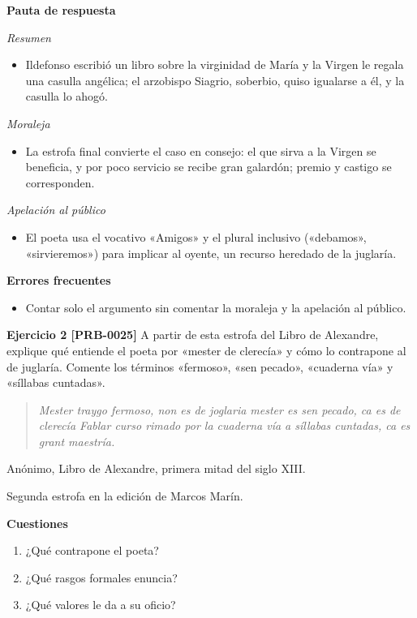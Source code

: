 \documentclass{book}
\begin{document}
\noindent\textbf{Pauta de respuesta}

\noindent\textit{Resumen}
\begin{itemize}
\item Ildefonso escribió un libro sobre la virginidad de María y la Virgen le regala una casulla angélica; el arzobispo Siagrio, soberbio, quiso igualarse a él, y la casulla lo ahogó.
\end{itemize}

\noindent\textit{Moraleja}
\begin{itemize}
\item La estrofa final convierte el caso en consejo: el que sirva a la Virgen se beneficia, y por poco servicio se recibe gran galardón; premio y castigo se corresponden.
\end{itemize}

\noindent\textit{Apelación al público}
\begin{itemize}
\item El poeta usa el vocativo «Amigos» y el plural inclusivo («debamos», «sirvieremos») para implicar al oyente, un recurso heredado de la juglaría.
\end{itemize}

\noindent\textbf{Errores frecuentes}
\begin{itemize}
\item Contar solo el argumento sin comentar la moraleja y la apelación al público.
\end{itemize}

\noindent\textbf{Ejercicio 2 [PRB-0025]}
A partir de esta estrofa del Libro de Alexandre, explique qué entiende el poeta por «mester de clerecía» y cómo lo contrapone al de juglaría. Comente los términos «fermoso», «sen pecado», «cuaderna vía» y «síllabas cuntadas».


\begin{quote}
\itshape Mester traygo fermoso, non es de joglaria mester es sen pecado, ca es de clerecía Fablar curso rimado por la cuaderna vía a síllabas cuntadas, ca es grant maestría.
\end{quote}
{\noindent\footnotesize Anónimo, Libro de Alexandre, primera mitad del siglo XIII.\par}
{\noindent\footnotesize Segunda estrofa en la edición de Marcos Marín.\par}

\noindent\textbf{Cuestiones}
\begin{enumerate}
\item ¿Qué contrapone el poeta?
\item ¿Qué rasgos formales enuncia?
\item ¿Qué valores le da a su oficio?
\end{enumerate}
\end{document}
